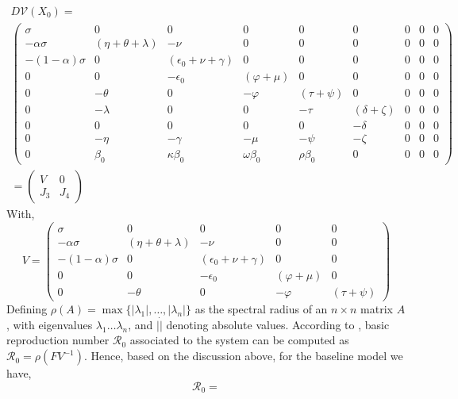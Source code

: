 \documentclass[authoryear,preprint]{elsarticle}
\begin{document}
\begin{equation}
\begin{split}
D \mathcal{V}(X_0) = \\
\begin{pmatrix}
\sigma & 0 & 0 & 0 & 0 & 0 &0 & 0 &0 \\
-\alpha \sigma & \left( \eta + \theta + \lambda\right)  & - \nu & 0 & 0 & 0 &0 & 0 &0 \\
-\left( 1- \alpha \right) \sigma & 0 & \left( \epsilon_0 + \nu + \gamma \right) & 0 & 0 & 0 &0 & 0 &0 \\
0 & 0 & - \epsilon_0 & \left( \varphi + \mu\right)  & 0 & 0 &0 & 0 &0 \\
0 & -\theta & 0 & -\varphi & \left( \tau + \psi\right)  & 0 &0 & 0 &0 \\
0 & -\lambda & 0 & 0 & -\tau & \left( \delta + \zeta\right)  &0 & 0 &0 \\
0 & 0 & 0 & 0 & 0 & -\delta &0 & 0 &0 \\
0 & -\eta & -\gamma & -\mu & -\psi & -\zeta &0 & 0 &0 \\
0 & \beta_0 & \kappa\beta_0 & \omega\beta_0 & \rho\beta_0 & 0 &0 & 0 &0
  \end{pmatrix}\\
  =\begin{pmatrix}
  V & 0\\
  J_3 & J_4
  \end{pmatrix}
\end{split}
\label{eqn:DFE-3}
\end{equation}
%
%
With,
%
%
\begin{equation}
V = \begin{pmatrix}
\sigma & 0 & 0 & 0 & 0 \\
-\alpha \sigma & \left( \eta + \theta + \lambda\right)  & - \nu & 0 & 0 \\
-\left( 1- \alpha \right) \sigma & 0 & \left( \epsilon_0 + \nu + \gamma \right) & 0 & 0 \\
0 & 0 & - \epsilon_0 & \left( \varphi + \mu\right)  & 0 \\
0 & -\theta & 0 & -\varphi & \left( \tau + \psi\right)
\end{pmatrix}
\label{eqn:DFE-4}
\end{equation}
%
%
Defining $\rho(A) = \max {\{ | \lambda_1 |, \ldots,  | \lambda_n |\} }$ as the spectral radius of an $n \times n$ matrix $A$, with eigenvalues $\lambda_1 \ldots \lambda_n$, and $|\dot|$ denoting absolute values. According to \cite{VANDENDRIESSCHE200229}, basic reproduction number $\mathcal{R}_0$ associated to the system can be computed as $\mathcal{R}_0 = \rho(FV^{-1})$. Hence, based on the discussion above, for the baseline model we have,
%
%
\begin{equation}
\mathcal{R}_0 = 
\label{eqn:Rnot}
\end{equation}
%
%
\end{document}
